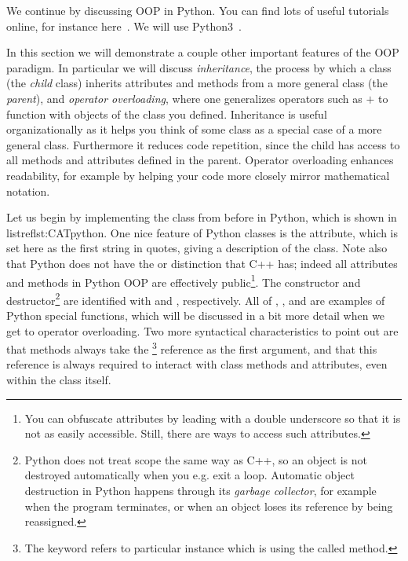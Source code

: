 We continue by discussing OOP in Python. 
You can find lots of useful
tutorials online, for instance here~\cite{pythonOOP}. We will use
Python3~\cite{python3}.

In this section we will demonstrate
a couple other important features of the OOP paradigm. In particular we will
discuss {\it inheritance}, the process by which a
class (the {\it child} class) inherits attributes and methods
from a more general class (the {\it parent}), and
{\it operator overloading},  where one generalizes 
operators such as $+$ to function with objects of the class you defined.
Inheritance is useful organizationally as it helps you think of some class
as a special case of a more general class. Furthermore it reduces code
repetition, since the child has access to all methods and attributes defined in
the parent. Operator overloading enhances readability, for example by
helping your code more closely mirror mathematical notation.

\begin{code*}
\caption{Example  class in Python. Here 
inherits from .}
\label{lst:CATpython}
\end{code*}

Let us begin by implementing the  class from before in Python,
which is shown in \\listref{lst:CATpython}. One nice feature of Python classes
is the  attribute, which is set here as the first string
in quotes, giving a description of the class. Note also that Python
does not have the  or  distinction that
C++ has; indeed all attributes and methods in Python OOP are effectively 
public\footnote{You can obfuscate attributes by leading with a double 
underscore \ff{\_\_} so that it is not as easily accessible. Still, there 
are ways to access such attributes.}.
The constructor and destructor\footnote{Python does not treat scope the same
way as C++, so an object is not destroyed automatically when you e.g.
exit a  loop. Automatic object destruction in Python 
happens through 
its {\it garbage collector}, for example when the program terminates,
or when an object loses its reference by being reassigned.} are identified with
 and , respectively. All of
, , and  
are examples of
Python special functions, which will be discussed in a bit more detail
when we get to operator overloading. 
Two more syntactical characteristics 
to point out are that methods always take the \footnote{The
 keyword refers to particular instance which is using
the called method.} reference as 
the first argument, and that this reference is always required to
interact with class methods and attributes, even within the class itself.

